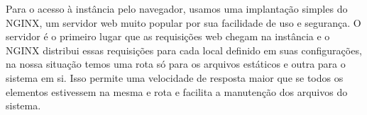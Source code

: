 \par Para o acesso à instância pelo navegador, usamos uma implantação simples do NGINX, um servidor web muito popular por sua facilidade de uso e segurança. O servidor é o primeiro lugar que as requisições web chegam na instância e o NGINX distribui essas requisições para cada local definido em suas configurações, na nossa situação temos uma rota só para os arquivos estáticos e outra para o sistema em si. Isso permite uma velocidade de resposta maior que se todos os elementos estivessem na mesma e rota e facilita a manutenção dos arquivos do sistema.




